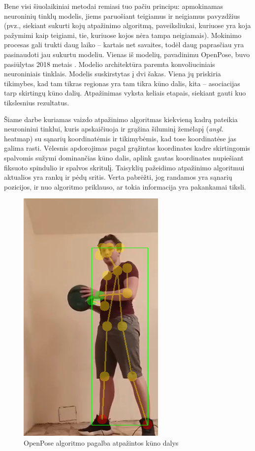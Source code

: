 \documentclass{VUMIFPSbakalaurinis}
\begin{document}
Bene visi šiuolaikiniai metodai remiasi tuo pačiu principu: apmokinamas neuroninių tinklų modelis, jiems paruošiant teigiamus ir neigiamus pavyzdžius (pvz., siekiant sukurti kojų atpažinimo algoritmą, paveiksliukai, kuriuose yra koja pažymimi kaip teigiami, tie, kuriuose kojos nėra tampa neigiamais). Mokinimo procesas gali trukti daug laiko – kartais net savaites, todėl daug paprasčiau yra pasinaudoti jau sukurtu modeliu. Vienas iš modelių, pavadinimu OpenPose, buvo pasiūlytas 2018 metais \cite{cao2019openpose}. Modelio architektūra paremta konvoliuciniais neuroniniais tinklais. Modelis suskirstytas į dvi šakas. Viena jų priskiria tikimybes, kad tam tikras regionas yra tam tikra kūno dalis, kita – asociacijas tarp skirtingų kūno dalių. Atpažinimas vyksta keliais etapais, siekiant gauti kuo tikslesnius rezultatus. 

Šiame darbe kuriamas vaizdo atpažinimo algoritmas kiekvieną kadrą pateikia neuroniniui tinklui, kuris apskaičiuoja ir grąžina šiluminį žemėlapį (\textit{angl.} heatmap) su sąnarių koordinatėmis ir tikimybėmis, kad tose koordinatėse jas galima rasti. Vėlesnis apdorojimas pagal grąžintas koordinates kadre skirtingomis spalvomis sužymi dominančias kūno dalis, aplink gautas koordinates nupiešiant fiksuoto spindulio ir spalvos skritulį. Taisyklių pažeidimo atpažinimo algoritmui aktualios yra rankų ir pėdų sritis. Verta pabrėžti, jog randamos yra sąnarių pozicijos, ir nuo algoritmo priklauso, ar tokia informacija yra pakankamai tiksli. 

\begin{figure}[H]
    \centering
    \includegraphics[scale=0.8]{img/body-parts-better}
    \caption{OpenPose algoritmo pagalba atpažintos kūno dalys}
    \label{img:mlp}
\end{figure}
\end{document}
